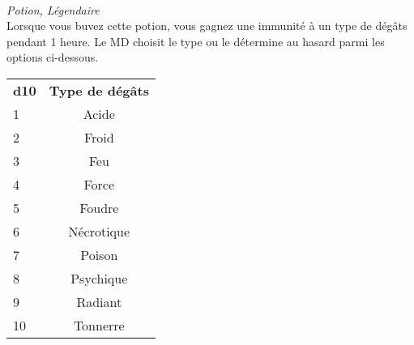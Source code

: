 \\
{\small \it Potion, Légendaire}\\
Lorsque vous buvez cette potion, vous gagnez une immunité à un type de dégâts 
pendant 1 heure. Le MD choisit le type ou le détermine au hasard parmi les 
options ci-dessous. \\

\begin{center}
\setlength{\tabcolsep}{4pt}
\begin{tabular}{lc}
\bf d10 & \bf Type de dégâts \\
   \rowcolor{LightCyan}
 1      & Acide \\
 2      & Froid \\
   \rowcolor{LightCyan}
 3      & Feu \\
 4      & Force \\
   \rowcolor{LightCyan}
 5      & Foudre \\
 6      & Nécrotique \\
   \rowcolor{LightCyan}
 7      & Poison \\
 8      & Psychique \\
   \rowcolor{LightCyan}
 9      & Radiant \\
10      & Tonnerre \\
\end{tabular}
\end{center}

